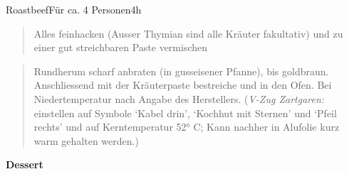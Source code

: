 \documentclass[
  a4paper,
]{article}
\begin{document}
\begin{recipe}{Roastbeef}{Für ca. 4 Personen}{4h}


\begin{quote}
Alles feinhacken (Ausser Thymian sind alle Kräuter fakultativ) und zu
einer gut streichbaren Paste vermischen
\end{quote}

\freeform\hrulefill


\begin{quote}
Rundherum scharf anbraten (in gusseisener Pfanne), bis goldbraun.
Anschliessend mit der Kräuterpaste bestreiche und in den Ofen. Bei
Niedertemperatur nach Angabe des Herstellers. (\emph{V-Zug Zartgaren:}
einstellen auf Symbole `Kabel drin', `Kochhut mit Sternen' und `Pfeil
rechts' und auf Kerntemperatur 52° C; Kann nachher in Alufolie kurz warm
gehalten werden.)
\end{quote}

\freeform\hrulefill\newline\freeform{}\end{recipe}

\newpage 
\vspace*{\fill}

\textbf{\Huge \sf Dessert} \vspace*{\fill} \thispagestyle{empty}
\newpage
\end{document}
